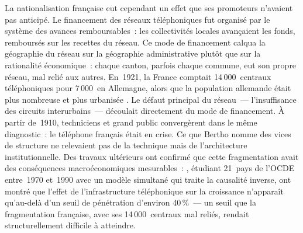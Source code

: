 La nationalisation française eut cependant un effet que ses promoteurs n'avaient pas anticipé. Le financement des réseaux téléphoniques fut organisé par le système des \og avances remboursables\fg{}~: les collectivités locales avançaient les fonds, remboursés sur les recettes du réseau. Ce mode de financement calqua la géographie du réseau sur la géographie administrative plutôt que sur la rationalité économique~: chaque canton, parfois chaque commune, eut son propre réseau, mal relié aux autres. En~1921, la France comptait 14\,000~centraux téléphoniques pour 7\,000~en Allemagne, alors que la population allemande était plus nombreuse et plus urbanisée \parencite{bertho_histoire_1984}. Le défaut principal du réseau~--- l'insuffisance des circuits interurbains~--- découlait directement du mode de financement. À partir de~1910, techniciens et grand public convergèrent dans le même diagnostic~: le téléphone français était en crise. Ce que Bertho nomme des \og vices de structure\fg{} ne relevaient pas de la technique mais de l'architecture institutionnelle. Des travaux ultérieurs ont confirmé que cette fragmentation avait des conséquences macroéconomiques mesurables~: \textcite{roller_telecommunications_2001}, étudiant 21~pays de l'OCDE entre~1970 et~1990 avec un modèle simultané qui traite la causalité inverse, ont montré que l'effet de l'infrastructure téléphonique sur la croissance n'apparaît qu'au-delà d'un seuil de pénétration d'environ 40\,\%~--- un seuil que la fragmentation française, avec ses 14\,000~centraux mal reliés, rendait structurellement difficile à atteindre.

